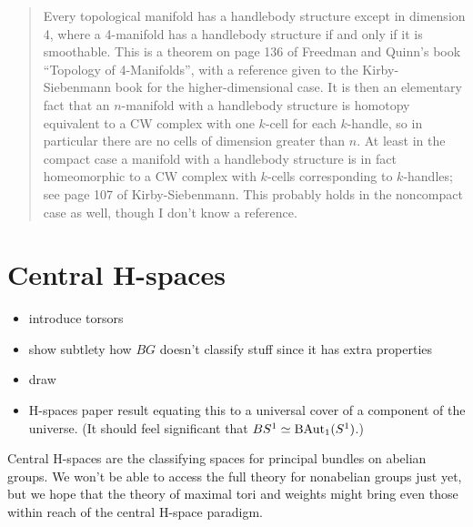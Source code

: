 \documentclass[12pt]{article}
\begin{document}
\begin{quote}
Every topological manifold has a handlebody structure except in dimension 4, where a 4-manifold has a handlebody structure if and only if it is smoothable. This is a theorem on page 136 of Freedman and Quinn's book ``Topology of 4-Manifolds'', with a reference given to the Kirby-Siebenmann book for the higher-dimensional case. It is then an elementary fact that an \( n \)-manifold with a handlebody structure is homotopy equivalent to a CW complex with one \( k \)-cell for each \( k \)-handle, so in particular there are no cells of dimension greater than \( n \). At least in the compact case a manifold with a handlebody structure is in fact homeomorphic to a CW complex with \( k \)-cells corresponding to \( k \)-handles; see page 107 of Kirby-Siebenmann. This probably holds in the noncompact case as well, though I don't know a reference.
\end{quote}


 
\section{Central H-spaces}

\begin{itemize}
\item introduce torsors
\item show subtlety how \( BG \) doesn't classify stuff since it has extra properties
\item draw 
\item H-spaces paper result equating this to a universal cover of a component of the universe. (It should feel significant that \( BS^1\simeq \mathrm{BAut}_1(S^1) \).)
\end{itemize}

Central H-spaces are the classifying spaces for principal bundles on abelian groups. We won't be able to access the full theory for nonabelian groups just yet, but we hope that the theory of maximal tori and weights might bring even those within reach of the central H-space paradigm.
\end{document}
